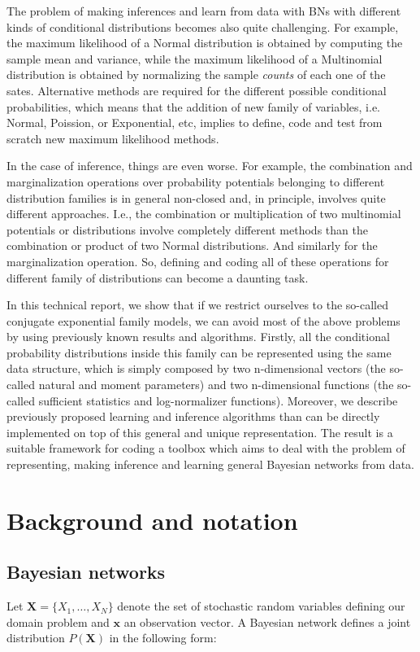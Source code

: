 \documentclass[11pt, oneside]{article}   	%
\newcommand{\bm}{\mathbf}
\numberwithin{figure}{section}
\numberwithin{equation}{section}
\numberwithin{table}{section}
\theoremstyle{definition}
\begin{document}
The problem of making inferences and learn from data with BNs with different kinds of conditional distributions becomes also quite challenging. For example, the maximum likelihood of a Normal distribution is obtained by computing the sample mean and variance, while the maximum likelihood of a Multinomial distribution is obtained by normalizing the sample \textit{counts} of each one of the sates. Alternative methods are required for the different possible conditional probabilities, which means that the addition of new family of variables, i.e. Normal, Poission, or Exponential, etc, implies to define, code and test from scratch new maximum likelihood methods.  

In the case of inference, things are even worse. For example, the combination and marginalization operations over probability potentials belonging to different distribution families is in general non-closed and, in principle, involves quite different approaches. I.e., the combination or multiplication of two multinomial potentials or distributions involve completely different methods than the combination or product of two Normal distributions. And similarly for the marginalization operation. So, defining and coding all of these operations for different family of distributions can become a daunting task. 

In this technical report, we show that if we restrict ourselves to the so-called conjugate exponential family models, we can avoid most of the above problems by using previously known results and algorithms. Firstly, all the conditional probability distributions inside this family can be represented using the same data structure, which is simply composed by two n-dimensional vectors (the so-called natural and moment parameters) and two n-dimensional functions (the so-called sufficient statistics and log-normalizer functions). Moreover, we describe previously proposed learning and inference algorithms than can be directly implemented on top of this general and unique representation. The result is a suitable framework for coding a toolbox which aims to deal with the problem of representing, making inference and learning general Bayesian networks from data.


\section{Background and notation}

\subsection*{Bayesian networks}
Let $\bm X = \{X_1,\ldots,X_N\}$ denote the set of stochastic random variables defining our domain problem and $\bm x$ an observation vector. A Bayesian network defines a joint distribution $P(\bm X)$ in the following form:
\end{document}
